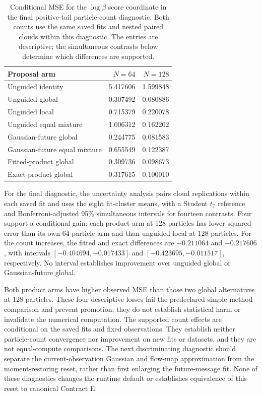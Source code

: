 \begin{table}[htbp]
\centering\small
\begin{tabular}{lrr}
\toprule
Proposal arm & $N=64$ & $N=128$\\
\midrule
Unguided identity & 5.417606 & 1.599848\\
Unguided global & 0.307492 & 0.080886\\
Unguided local & 0.715379 & 0.220078\\
Unguided equal mixture & 1.006312 & 0.162202\\
Gaussian-future global & 0.244775 & 0.081583\\
Gaussian-future equal mixture & 0.655549 & 0.122387\\
Fitted-product global & 0.309736 & 0.098673\\
Exact-product global & 0.317615 & 0.100010\\
\bottomrule
\end{tabular}
\caption{Conditional MSE for the $\log\beta$ score coordinate in the final
positive-tail particle-count diagnostic. Both counts use the same saved fits
and nested paired clouds within this diagnostic. The entries are descriptive;
the simultaneous contrasts below determine which differences are supported.}
\label{tab:bg-product-count-mse}
\end{table}

For the final diagnostic, the uncertainty analysis pairs cloud replications
within each saved fit and uses the eight fit-cluster means, with a Student
$t_7$ reference and Bonferroni-adjusted 95\% simultaneous intervals for fourteen
contrasts. Four support a conditional gain: each product arm at 128 particles
has lower squared error than its own 64-particle arm and than unguided local
at 128 particles. For the count increases, the fitted and exact differences
are $-0.211064$ and $-0.217606$, with intervals
$[-0.404694,-0.017433]$ and $[-0.423695,-0.011517]$, respectively. No interval
establishes improvement over unguided global or Gaussian-future global.

Both product arms have higher observed MSE than those two global alternatives
at 128 particles. These four descriptive losses fail the predeclared
simple-method comparison and prevent promotion; they do not establish
statistical harm or invalidate the numerical computation. The supported
count effects are conditional on the saved fits and fixed observations. They
establish neither particle-count convergence nor improvement on new fits or
datasets, and they are not equal-compute comparisons. The next discriminating
diagnostic should separate the current-observation Gaussian and flow-map
approximation from the moment-restoring reset, rather than first enlarging
the future-message fit. None of these diagnostics changes the runtime default
or establishes equivalence of this reset to canonical Contract E.

